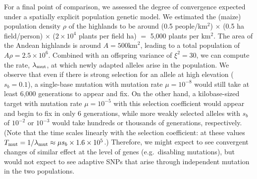 {{For a final point of comparison, we assessed the degree of convergence expected under a spatially explicit population genetic model.
We estimated the (maize) population density $\rho$ of the highlands to be around (0.5 people/km$^2$) $\times$ (0.5 ha field/person) $\times$ ($2\times10^4$ plants per field ha) $=$ 5,000 plants per km$^2$.
The area of the Andean highlands is around $A=500\text{km}^2$, leading to a total population of $A \rho = 2.5 \times 10^6$.
Combined with an offspring variance of $\xi^2 = 30$, we can compute the rate, $\lambda_{\text{mut}}$, at which newly adapted alleles arise in the population.
We observe that even if there is strong selection for an allele at high elevation ($s_b=0.1$), a single-base mutation with mutation rate $\mu=10^{-8}$ would still take at least 6,000 generations to appear and fix.
On the other hand, a kilobase-sized target with mutation rate $\mu=10^{-5}$ with this selection coefficient would appear and begin to fix in only 6 generations, while more weakly selected alleles with $s_b$ of $10^{-2}$ or $10^{-3}$ would take hundreds or thousands of generations, respectively.
(Note that the time scales linearly with the selection coefficient: at these values $T_{\text{mut}} = 1/\lambda_{\text{mut}} \approx \mu s_b \times 1.6\times 10^5$.)
Therefore, we might expect to see convergent changes of similar effect at the level of genes (e.g.\ disabling mutations), but would not expect to see adaptive SNPs that arise through independent mutation in the two populations.


}}
